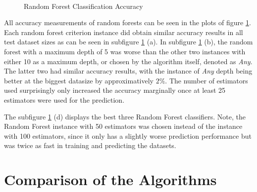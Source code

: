\documentclass{article}[12pt]
\theoremstyle{mydef}
\begin{document}
            \begin{figure}[!h]
                \centering
                \quad
                \\
                \quad
                \caption{Random Forest Classification Accuracy}
                \label{fig:random-forest-classification-accuracy}
            \end{figure}


            All accuracy measurements of random forests can be seen in the plots of figure \ref{fig:random-forest-classification-accuracy}.
            Each random forest criterion instance did obtain similar accuracy results in all test dataset sizes as can be seen in subfigure \ref{fig:random-forest-classification-accuracy} (a).
            In subfigure \ref{fig:random-forest-classification-accuracy} (b), the random forest with a maximum depth of 5 was worse than the other two instances with either 10 as a maximum depth, or chosen by the algorithm itself, denoted as \emph{Any}.
            The latter two had similar accuracy results, with the instance of \emph{Any} depth being better at the biggest datasize by approximatively $2\%$.
            The number of estimators used surprisingly only increased the accuracy marginally once at least 25 estimators were used for the prediction.

            The subfigure \ref{fig:random-forest-classification-accuracy} (d) displays the best three Random Forest classifiers. 
            Note, the Random Forest instance with 50 estimators was chosen instead of the instance with 100 estimators, since it only has a slightly worse prediction performance but was twice as fast in training and predicting the datasets.


    \section{Comparison of the Algorithms}
    \label{sec:comparison}
\end{document}
